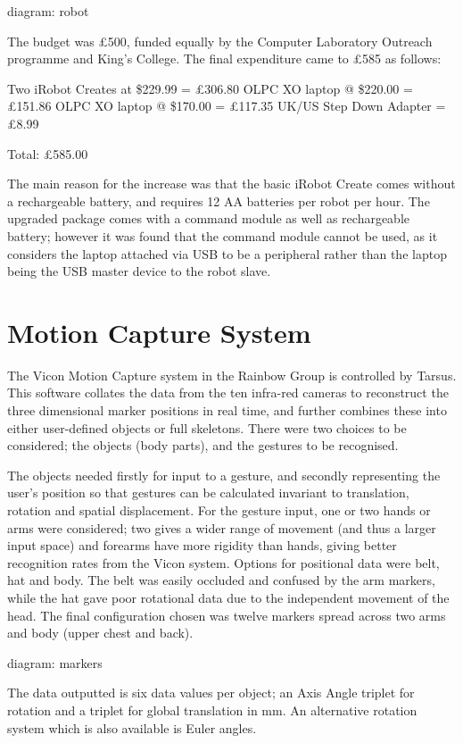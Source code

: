 \documentclass[12pt,a4,notitlepage]{report}
\renewcommand{\_}{\texttt{\symbol{95}}}
\newcommand{\<}{\texttt{\symbol{60}}}
\renewcommand{\>}{\texttt{\symbol{62}}}
\begin{document}
{diagram: robot}

The budget was \pounds 500, funded equally by the Computer Laboratory Outreach programme and King's College. The final expenditure came to \pounds 585 as follows:

Two iRobot Creates at \$229.99 = \pounds 306.80
OLPC XO laptop @ \$220.00 = \pounds 151.86
OLPC XO laptop @ \$170.00 = \pounds 117.35
UK/US Step Down Adapter = \pounds 8.99

Total: \pounds 585.00

The main reason for the increase was that the basic iRobot Create comes without a rechargeable battery, and requires 12 AA batteries per robot per hour. The upgraded package comes with a command module as well as rechargeable battery; however it was found that the command module cannot be used, as it considers the laptop attached via USB to be a peripheral rather than the laptop being the USB master device to the robot slave.

\section{Motion Capture System}

The Vicon Motion Capture system in the Rainbow Group is controlled by Tarsus. This software collates the data from the ten infra-red cameras to reconstruct the three dimensional marker positions in real time, and further combines these into either user-defined objects or full skeletons. There were two choices to be considered; the objects (body parts), and the gestures to be recognised.

The objects needed firstly for input to a gesture, and secondly representing the user's position so that gestures can be calculated invariant to translation, rotation and spatial displacement. For the gesture input, one or two hands or arms were considered; two gives a wider range of movement (and thus a larger input space) and forearms have more rigidity than hands, giving better recognition rates from the Vicon system. Options for positional data were belt, hat and body. The belt was easily occluded and confused by the arm markers, while the hat gave poor rotational data due to the independent movement of the head. The final configuration chosen was twelve markers spread across two arms and body (upper chest and back).

{diagram: markers}

The data outputted is six data values per object; an Axis Angle triplet for rotation and a triplet for global translation in mm. An alternative rotation system which is also available is Euler angles.
\end{document}
